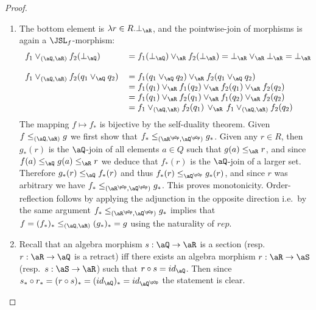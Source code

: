 \documentclass{article}
\begin{document}
\begin{proof}
\begin{enumerate}
\item
The bottom element is $\lambda r \in R. \bot_\aR$, and the pointwise-join of morphisms is again a $\JSL_f$-morphism:
\[
\begin{tabular}{ll}
$f_1 \lor_{(\aQ,\aR)} f_2 (\bot_\aQ)$ 
&
$= f_1(\bot_\aQ) \lor_\aR f_2(\bot_\aR) 
= \bot_\aR \lor_\aR \bot_\aR 
= \bot_\aR$
\\\\
$f_1 \lor_{(\aQ,\aR)} f_2(q_1 \lor_\aQ q_2)$
&
$= f_1(q_1 \lor_\aQ q_2) \lor_\aR f_2(q_1 \lor_\aQ q_2)$
\\ &
$= f_1(q_1) \lor_\aR f_1(q_2) \lor_\aR f_2(q_1) \lor_\aR f_2(q_2)$
\\ &
$= f_1(q_1) \lor_\aR f_2(q_1) \lor_\aR f_1(q_2) \lor_\aR f_2(q_2)$
\\ &
$= f_1 \lor_{(\aQ,\aR)} f_2(q_1) \, \lor_\aR \, f_1 \lor_{(\aQ,\aR)} f_2(q_2)$
\end{tabular}
\]
The mapping $f \mapsto f_*$ is bijective by the self-duality theorem. Given $f \leq_{(\aQ,\aR)} g$ we first show that $f_* \leq_{(\aR^{\pOp},\aQ^{\pOp})} g_*$. Given any $r \in R$, then $g_*(r)$ is the $\aQ$-join of all elements $a \in Q$ such that $g(a) \leq_\aR r$, and since $f(a) \leq_\aQ g(a) \leq_\aR r$ we deduce that $f_*(r)$ is the $\aQ$-join of a larger set. Therefore $g_*(r) \leq_\aQ f_*(r)$ and thus $f_*(r) \leq_{\aQ^{\pOp}} g_*(r)$, and since $r$ was arbitrary we have $f_* \leq_{(\aR^{\pOp},\aQ^{\pOp})} g_*$. This proves monotonicity. Order-reflection follows by applying the adjunction in the opposite direction i.e.\ by the same argument $f_* \leq_{(\aR^{\pOp},\aQ^{\pOp})} g_*$ implies that $f = (f_*)_* \leq_{(\aQ,\aR)} (g_*)_* = g$ using the naturality of $rep$.

\item
Recall that an algebra morphism $s : \aQ \to \aR$ is a section (resp.\ $r : \aR \to \aQ$ is a retract) iff there exists an algebra morphism $r : \aR \to \aS$ (resp.\ $s : \aS \to \aR$) such that $r \circ s = id_\aQ$. Then since $s_* \circ r_* = (r \circ s)_* = (id_{\aQ})_* = id_{\aQ^{\pOp}}$ the statement is clear.

\end{enumerate}
\end{proof}

\end{document}
